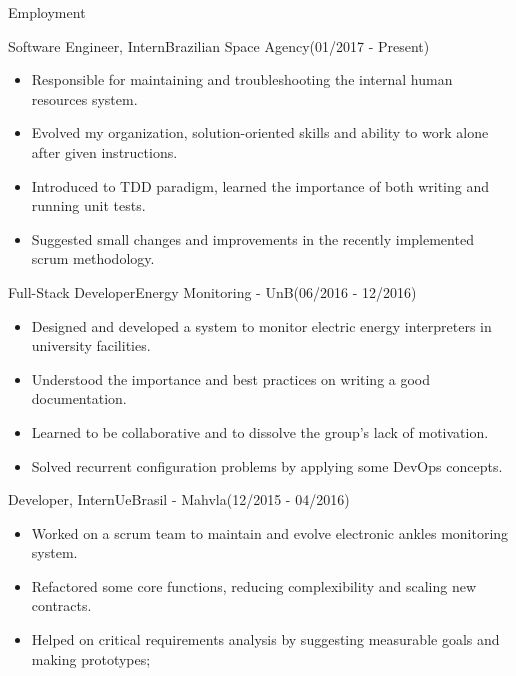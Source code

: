\documentclass[]{fraguilarcv}
\begin{document}
	\makeheader

	\begin{cvsection}{Employment}
		\begin{cvsubsection}{Software Engineer, Intern}{Brazilian Space Agency}{(01/2017 - Present)}
			\begin{itemize}
				\item Responsible for maintaining and troubleshooting the internal human resources system.
                \item Evolved my organization, solution-oriented skills and ability to work alone after given instructions.
				\item Introduced to TDD paradigm, learned the importance of both writing and running unit tests. 
                \item Suggested small changes and improvements in the recently implemented scrum methodology.
			\end{itemize}
		\end{cvsubsection}

		\begin{cvsubsection}{Full-Stack Developer}{Energy Monitoring - UnB}{(06/2016 - 12/2016)}
			\begin{itemize}
                \item Designed and developed a system to monitor electric energy interpreters in university facilities.
                \item Understood the importance and best practices on writing a good documentation.
                \item Learned to be collaborative and to dissolve the group's lack of motivation.
                \item Solved recurrent configuration problems by applying some DevOps concepts.
			\end{itemize}
		\end{cvsubsection}

		\begin{cvsubsection}{Developer, Intern}{UeBrasil - Mahvla}{(12/2015 - 04/2016)}
			\begin{itemize}
				\item Worked on a scrum team to maintain and evolve electronic ankles 								monitoring system.
                \item Refactored some core functions, reducing complexibility and scaling new 						contracts.
                \item Helped on critical requirements analysis by suggesting measurable goals 						and making prototypes;
			\end{itemize}
		\end{cvsubsection}
        

\end{cvsection}
\end{document}
